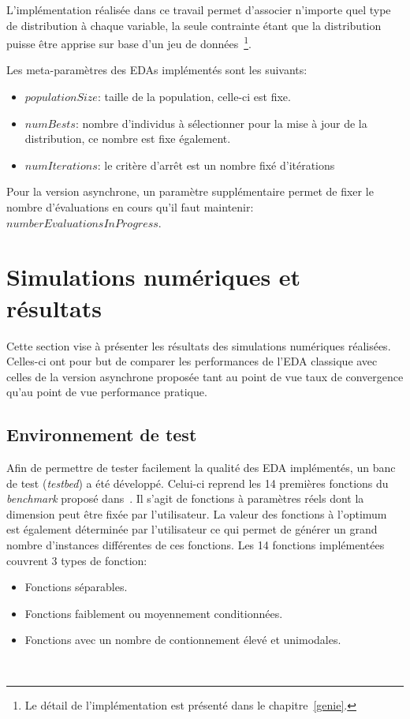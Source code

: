 \documentclass[a4paper, 12pt]{report}
\begin{document}
L'implémentation réalisée dans ce travail permet d'associer n'importe quel type de distribution à chaque variable, la seule contrainte étant que la distribution puisse être apprise sur base d'un jeu de données~\footnote{Le détail de l'implémentation est présenté dans le chapitre~\ref{genie}.}. 

Les meta-paramètres des EDAs implémentés sont les suivants:
\begin{itemize}
\item $populationSize$: taille de la population, celle-ci est fixe.
\item $numBests$: nombre d'individus à sélectionner pour la mise à jour de la distribution, ce nombre est fixe également.
\item $numIterations$: le critère d'arrêt est un nombre fixé d'itérations
\end{itemize}    
Pour la version asynchrone, un paramètre supplémentaire permet de fixer le nombre d'évaluations en cours qu'il faut maintenir: $numberEvaluationsInProgress$.


\section{Simulations numériques et résultats}
\label{simunum}
Cette section vise à présenter les résultats des simulations numériques réalisées. Celles-ci ont pour but de comparer les performances de l'EDA classique avec celles de la version asynchrone proposée tant au point de vue taux de convergence qu'au point de vue performance pratique.

\subsection{Environnement de test}
Afin de permettre de tester facilement la qualité des EDA implémentés, un banc de test (\textit{testbed}) a été développé. Celui-ci reprend les 14 premières fonctions du \textit{benchmark} proposé dans~\cite{TESTBED}. Il s'agit de fonctions à paramètres réels dont la dimension peut être fixée par l'utilisateur. La valeur des fonctions à l'optimum est également déterminée par l'utilisateur ce qui permet de générer un grand nombre d'instances différentes de ces fonctions. Les 14 fonctions implémentées couvrent 3 types de fonction:
\begin{itemize}
\item Fonctions séparables.
\item Fonctions faiblement ou moyennement conditionnées.
\item Fonctions avec un nombre de contionnement élevé et unimodales. %
\end{itemize}
\ 
\end{document}
